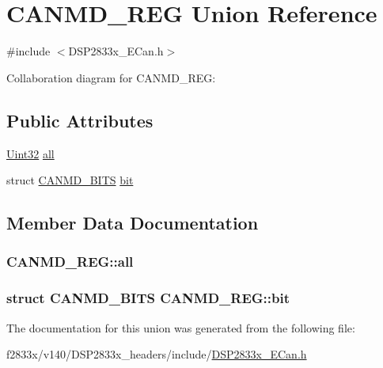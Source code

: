 \hypertarget{union_c_a_n_m_d___r_e_g}{}\section{C\+A\+N\+M\+D\+\_\+\+R\+E\+G Union Reference}
\label{union_c_a_n_m_d___r_e_g}


{\ttfamily \#include $<$D\+S\+P2833x\+\_\+\+E\+Can.\+h$>$}



Collaboration diagram for C\+A\+N\+M\+D\+\_\+\+R\+E\+G\+:
\subsection*{Public Attributes}
\begin{DoxyCompactItemize}
\item 
\hyperlink{_d_s_p2833x___device_8h_aba99025e657f892beb7ff31cecf64653}{Uint32} \hyperlink{union_c_a_n_m_d___r_e_g_ad86d58e232667c09310181650e859585}{all}
\item 
struct \hyperlink{struct_c_a_n_m_d___b_i_t_s}{C\+A\+N\+M\+D\+\_\+\+B\+I\+T\+S} \hyperlink{union_c_a_n_m_d___r_e_g_ad5366922c417707e00f0f6f174cd3b8e}{bit}
\end{DoxyCompactItemize}


\subsection{Member Data Documentation}
\hypertarget{union_c_a_n_m_d___r_e_g_ad86d58e232667c09310181650e859585}{}
\subsubsection[{all}]{ C\+A\+N\+M\+D\+\_\+\+R\+E\+G\+::all}\label{union_c_a_n_m_d___r_e_g_ad86d58e232667c09310181650e859585}
\hypertarget{union_c_a_n_m_d___r_e_g_ad5366922c417707e00f0f6f174cd3b8e}{}
\subsubsection[{bit}]{\setlength{\rightskip}{0pt plus 5cm}struct {\bf C\+A\+N\+M\+D\+\_\+\+B\+I\+T\+S} C\+A\+N\+M\+D\+\_\+\+R\+E\+G\+::bit}\label{union_c_a_n_m_d___r_e_g_ad5366922c417707e00f0f6f174cd3b8e}


The documentation for this union was generated from the following file\+:\begin{DoxyCompactItemize}
\item 
f2833x/v140/\+D\+S\+P2833x\+\_\+headers/include/\hyperlink{_d_s_p2833x___e_can_8h}{D\+S\+P2833x\+\_\+\+E\+Can.\+h}\end{DoxyCompactItemize}
